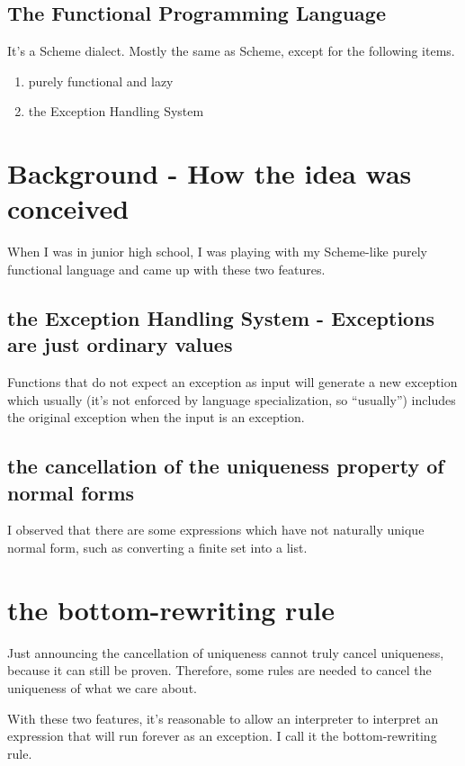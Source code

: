 \documentclass[11pt,preprint,numbers]{sigplanconf}
\begin{document}
\subsection{The Functional Programming Language}

It's a Scheme dialect. Mostly the same as Scheme, except for the following items.

\begin{enumerate}
\item purely functional and lazy
\item the Exception Handling System
\end{enumerate}

\section{Background - How the idea was conceived}

When I was in junior high school, I was playing with my Scheme-like purely functional language and
came up with these two features.

\subsection{the Exception Handling System - Exceptions are just ordinary values}

Functions that do not expect an exception as input will generate a new exception which usually (it's not enforced by language specialization, so ``usually'') includes the original exception when the input is an exception.

\subsection{the cancellation of the uniqueness property of normal forms}

I observed that there are some expressions which have not naturally unique normal form, such as converting a finite set into a list.

\section{the bottom-rewriting rule}

Just announcing the cancellation of uniqueness cannot truly cancel uniqueness, because it can still be proven. Therefore, some rules are needed to cancel the uniqueness of what we care about.

With these two features,
it's reasonable to allow an interpreter to interpret an expression that will run forever as an exception.
I call it the bottom-rewriting rule.
\end{document}
